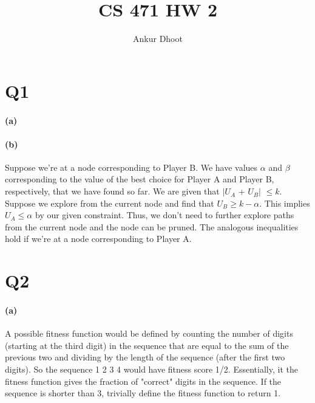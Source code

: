 \documentclass[11pt,a4paper]{article}
\begin{document}
\author{Ankur Dhoot}
\title{CS 471 HW 2}
\maketitle


\section*{Q1}

\paragraph*{(a)}
\begin{center}
\end{center}

\paragraph*{(b)}
Suppose we're at a node corresponding to Player B. We have values $\alpha$ and $\beta$ corresponding to the value of the best choice for Player A and Player B, respectively, that we have found so far. We are given that $|U_{A}$ + $U_{B}|$ $\leq k$. Suppose we explore from the current node and find that $U_{B} \geq k - \alpha$. This implies $U_{A} \leq \alpha$ by our given constraint. Thus, we don't need to further explore paths from the current node and the node can be pruned. The analogous inequalities hold if we're at a node corresponding to Player A.

\section*{Q2}
\paragraph*{(a)}
A possible fitness function would be defined by counting the number of digits (starting at the third digit) in the sequence that are equal to the sum of the previous two and dividing by the length of the sequence (after the first two digits). So the sequence 1 2 3 4 would have fitness score 1/2. Essentially, it the fitness function gives the fraction of "correct" digits in the sequence. If the sequence is shorter than 3, trivially define the fitness function to return 1.
\end{document}
